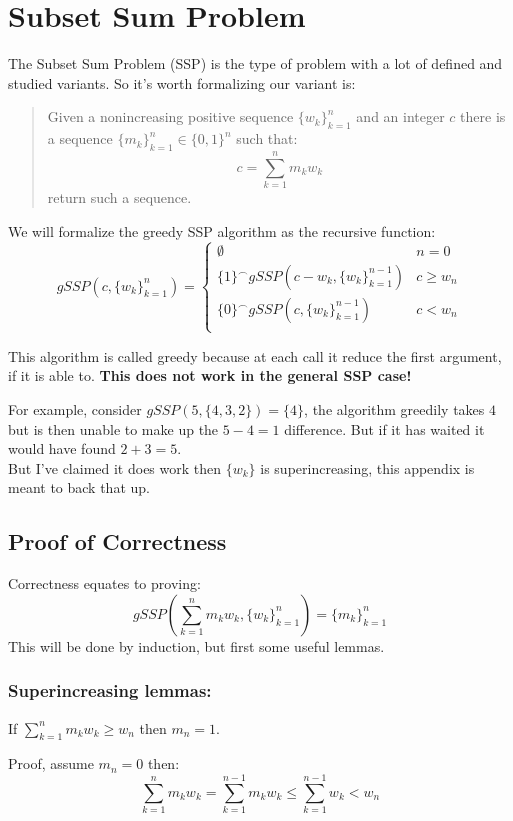 
\section{Subset Sum Problem}
\label{appx:SSP}
The Subset Sum Problem (SSP) is the type of problem with a lot of defined and studied variants.
So it's worth formalizing our variant is:
\begin{quote}
	Given a nonincreasing positive sequence $\{w_k\}_{k=1}^n$ and an integer $c$ there is a sequence $\{m_k\}_{k=1}^n \in \{0,1\}^n$ such that:
\[c = \sum_{k=1}^nm_kw_k\]
return such a sequence.
\end{quote}

We will formalize the greedy SSP algorithm as the recursive function:
\[gSSP(c,\{w_k\}_{k=1}^n) = \begin{cases}
	\emptyset & n = 0\\
	\{1\}^\frown gSSP(c-w_k,\{w_k\}_{k=1}^{n-1})& c \geq w_n \\
	\{0\}^\frown gSSP(c,\{w_k\}_{k=1}^{n-1})& c < w_n \\
\end{cases}\]

This algorithm is called greedy because at each call it reduce the first argument,
if it is able to.
{\bf This does not work in the general SSP case!}

For example, consider $gSSP(5,\{4,3,2\}) = \{4\}$,
the algorithm greedily takes $4$ but is then unable to make up the $5-4=1$ difference.
But if it has waited it would have found $2+3=5$.
\\

But I've claimed it does work then $\{w_k\}$ is superincreasing, 
this appendix is meant to back that up.

\subsection{Proof of Correctness}
Correctness equates to proving:
\[gSSP\left(\sum_{k=1}^nm_kw_k,\{w_k\}_{k=1}^n\right) =\{m_k\}_{k=1}^n\]
This will be done by induction, 
but first some useful lemmas.

\subsubsection{Superincreasing lemmas:}
If $\sum_{k=1}^nm_kw_k \geq w_n$ then $m_n = 1$.

Proof, assume $m_n = 0$ then:
\[\sum_{k=1}^nm_kw_k = \sum_{k=1}^{n-1}m_kw_k \leq \sum_{k=1}^{n-1}w_k < w_n\]

